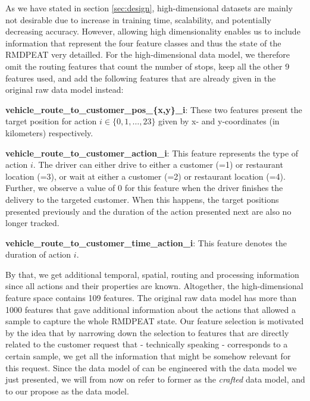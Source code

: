 As we have stated in section \ref{sec:design}, high-dimensional datasets are mainly not desirable due to increase in training time, scalability, and potentially decreasing accuracy. However, allowing high dimensionality enables us to include information that represent the four feature classes and thus the state of the RMDPEAT very detailled. For the high-dimensional data model, we therefore omit the routing features that count the number of stops, keep all the other 9 features \cite{Hildebrandt2020_EAT} used, and add the following features that are already given in the original raw data model instead:
\begin{description}[font=$\bullet$\scshape\bfseries]
	\item \textbf{vehicle\_route\_to\_customer\_pos\_\{x,y\}\_i}: These two features present the target position for action $ i \in \{0, 1, \dots, 23\}$ given by x- and y-coordinates (in kilometers) respectively. 
	\item  \textbf{vehicle\_route\_to\_customer\_action\_i}:
	This feature represents the type of action $ i $. The driver can either drive to either a customer (=1) or restaurant location (=3), or wait at either a customer (=2) or restaurant location (=4). Further, we observe a value of 0 for this feature when the driver finishes the delivery to the targeted customer. When this happens, the target positions presented previously and the duration of the action presented next are also no longer tracked. 
	\item
	\textbf{vehicle\_route\_to\_customer\_time\_action\_i}: This feature denotes the duration of action $ i $.
\end{description}
By that, we get additional temporal, spatial, routing and processing information since all actions and their properties are known. Altogether, the high-dimensional feature space contains 109 features. The original raw data model has more than 1000 features that gave additional information about the actions that allowed a sample to capture the whole RMDPEAT state. Our feature selection is motivated by the idea that by narrowing down the selection to features that are directly related to the customer request that - technically speaking - corresponds to a certain sample, we get all the information that might be somehow relevant for this request. Since the data model of \cite{Hildebrandt2020_EAT} can be engineered with the data model we just presented, we will from now on refer to former as the \textit{crafted} data model, and to our propose as the  data model.